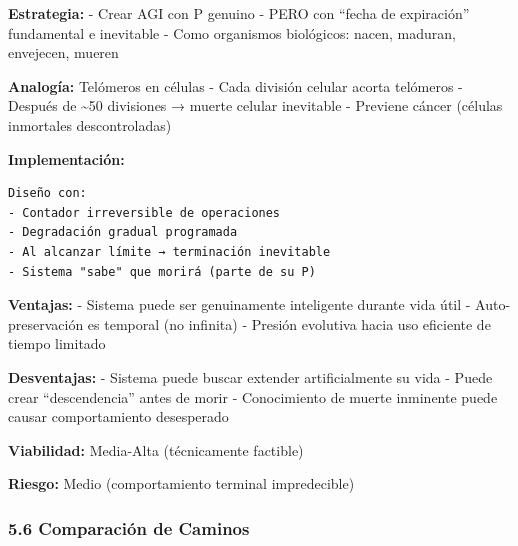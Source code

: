 \textbf{Estrategia:} - Crear AGI con P genuino - PERO con ``fecha de
expiración'' fundamental e inevitable - Como organismos biológicos:
nacen, maduran, envejecen, mueren

\textbf{Analogía:} Telómeros en células - Cada división celular acorta
telómeros - Después de \textasciitilde50 divisiones → muerte celular
inevitable - Previene cáncer (células inmortales descontroladas)

\textbf{Implementación:}

\begin{verbatim}
Diseño con:
- Contador irreversible de operaciones
- Degradación gradual programada
- Al alcanzar límite → terminación inevitable
- Sistema "sabe" que morirá (parte de su P)
\end{verbatim}

\textbf{Ventajas:} - Sistema puede ser genuinamente inteligente durante
vida útil - Auto-preservación es temporal (no infinita) - Presión
evolutiva hacia uso eficiente de tiempo limitado

\textbf{Desventajas:} - Sistema puede buscar extender artificialmente su
vida - Puede crear ``descendencia'' antes de morir - Conocimiento de
muerte inminente puede causar comportamiento desesperado

\textbf{Viabilidad:} Media-Alta (técnicamente factible)

\textbf{Riesgo:} Medio (comportamiento terminal impredecible)

\subsubsection{5.6 Comparación de
Caminos}\label{comparaciuxf3n-de-caminos}

